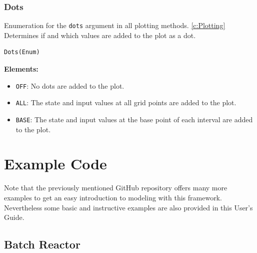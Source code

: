 \documentclass[12pt]{article}
\begin{document}
\subsubsection{Dots}
\label{c:Dots}
\begin{mdframed}[backgroundcolor=gray!10, roundcorner=10pt,
		linewidth=1pt]
	Enumeration for the \texttt{dots} argument in all plotting methods.
	\eqref{c:Plotting} Determines if and which values are added to the plot as a dot.

	\begin{lstlisting}
Dots(Enum)
	\end{lstlisting}
	\label{enum:Dots}
	\textbf{Elements:}
	\begin{itemize}
		\item \texttt{OFF}: No dots are added to the plot.
		\item \texttt{ALL}: The state and input values at all grid
		      points are added to the plot.
		\item \texttt{BASE}: The state and input values at the base
		      point of each interval are added to the plot.
	\end{itemize}

\end{mdframed}
\newpage
\section{Example Code}

Note that the previously mentioned GitHub repository offers many more examples to get an easy introduction to modeling with this framework. Nevertheless some basic and instructive examples are also provided in this User's Guide.

\subsection{Batch Reactor}
\end{document}
